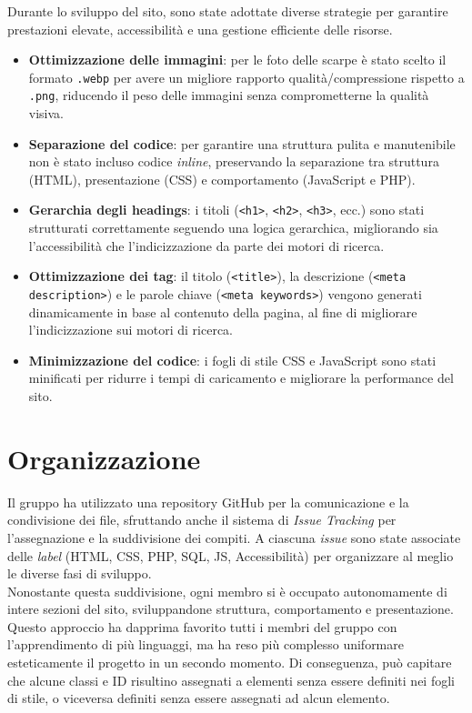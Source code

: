\documentclass[a4paper, 12pt]{article}
\begin{document}
\begin{justify}
Durante lo sviluppo del sito, sono state adottate diverse strategie per garantire prestazioni elevate, accessibilità e una gestione efficiente delle risorse.
\begin{itemize}
    \item \textbf{Ottimizzazione delle immagini}: per le foto delle scarpe è stato scelto il formato \texttt{.webp} per avere un migliore rapporto qualità/compressione rispetto a \texttt{.png}, riducendo il peso delle immagini senza comprometterne la qualità visiva.
    \item \textbf{Separazione del codice}: per garantire una struttura pulita e manutenibile non è stato incluso codice \textit{inline}, preservando la separazione tra struttura (HTML), presentazione (CSS) e comportamento (JavaScript e PHP).
    \item \textbf{Gerarchia degli headings}: i titoli (\texttt{<h1>}, \texttt{<h2>}, \texttt{<h3>}, ecc.) sono stati strutturati correttamente seguendo una logica gerarchica, migliorando sia l’accessibilità che l’indicizzazione da parte dei motori di ricerca.
    \item \textbf{Ottimizzazione dei tag}: il titolo (\texttt{<title>}), la descrizione (\texttt{<meta description>}) e le parole chiave (\texttt{<meta keywords>}) vengono generati dinamicamente in base al contenuto della pagina, al fine di migliorare l'indicizzazione sui motori di ricerca.
    \item \textbf{Minimizzazione del codice}: i fogli di stile CSS e JavaScript sono stati minificati per ridurre i tempi di caricamento e migliorare la performance del sito.
\end{itemize}


\section{Organizzazione}  

Il gruppo ha utilizzato una repository GitHub per la comunicazione e la condivisione dei file, sfruttando anche il sistema di \textit{Issue Tracking} per l'assegnazione e la suddivisione dei compiti. A ciascuna \textit{issue} sono state associate delle \textit{label} (HTML, CSS, PHP, SQL, JS, Accessibilità) per organizzare al meglio le diverse fasi di sviluppo.\\
Nonostante questa suddivisione, ogni membro si è occupato autonomamente di intere sezioni del sito, sviluppandone struttura, comportamento e presentazione. Questo approccio ha dapprima favorito tutti i membri del gruppo con l'apprendimento di più linguaggi, ma ha reso più complesso uniformare esteticamente il progetto in un secondo momento. Di conseguenza, può capitare che alcune classi e ID risultino assegnati a elementi senza essere definiti nei fogli di stile, o viceversa definiti senza essere assegnati ad alcun elemento.


\end{justify}
\end{document}
